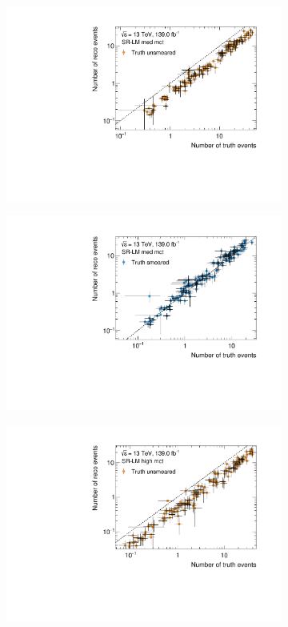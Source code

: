 \begin{figure}
\begin{subfigure}[b]{0.49\linewidth}
	\end{subfigure}\hfill
	\begin{subfigure}[b]{0.49\linewidth}
		\centering\includegraphics[width=\textwidth]{yields_SR-LM_med_mct_unsmeared}
	\end{subfigure}\hfill
	\begin{subfigure}[b]{0.49\linewidth}
		\centering\includegraphics[width=\textwidth]{yields_SR-LM_med_mct_smeared}
	\end{subfigure}\hfill
	\begin{subfigure}[b]{0.49\linewidth}
		\centering\includegraphics[width=\textwidth]{yields_SR-LM_high_mct_unsmeared}

\end{subfigure}
\end{figure}
